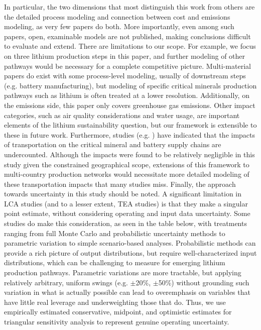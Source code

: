 \documentclass{article}
\renewcommand\_{\textunderscore\allowbreak}
\begin{document}
In particular, the two dimensions that most distinguish this work from others are the detailed process modeling and connection between cost and emissions modeling, as very few papers do both. More importantly, even among such papers, open, examinable models are not published, making conclusions difficult to evaluate and extend. There are limitations to our scope. For example, we focus on three lithium production steps in this paper, and further modeling of other pathways would be necessary for a complete competitive picture.  Multi-material papers do exist with some process-level modeling, usually of downstream steps (e.g. battery manufacturing), but modeling of specific critical minerals production pathways such as lithium is often treated at a lower resolution. Additionally, on the emissions side, this paper only covers greenhouse gas emissions. Other impact categories, such as air quality considerations and water usage, are important elements of the lithium sustainability question, but our framework is extensible to these in future work. Furthermore, studies (e.g. \citet{thomsenMineManufacturerAssessing2025}) have indicated that the impacts of transportation on the critical mineral and battery supply chains are undercounted. Although the impacts were found to be relatively negligible in this study given the constrained geographical scope, extensions of this framework to multi-country production networks would necessitate more detailed modeling of these transportation impacts that many studies miss. Finally, the approach towards uncertainty in this study should be noted. A significant limitation in LCA studies (and to a lesser extent, TEA studies) is that they make a singular point estimate, without considering operating and input data uncertainty. Some studies do make this consideration, as seen in the table below, with treatments ranging from full Monte Carlo and probabilistic uncertainty methods to parametric variation to simple scenario-based analyses. Probabilistic methods can provide a rich picture of output distributions, but require well-characterized input distributions, which can be challenging to measure for emerging lithium production pathways. Parametric variations are more tractable, but applying relatively arbitrary, uniform swings (e.g. $\pm$20\%, $\pm$50\%) without grounding such variation in what is actually possible can lead to overemphasis on variables that have little real leverage and underweighting those that do. Thus, we use empirically estimated conservative, midpoint, and optimistic estimates for triangular sensitivity analysis to represent genuine operating uncertainty. 
\end{document}
